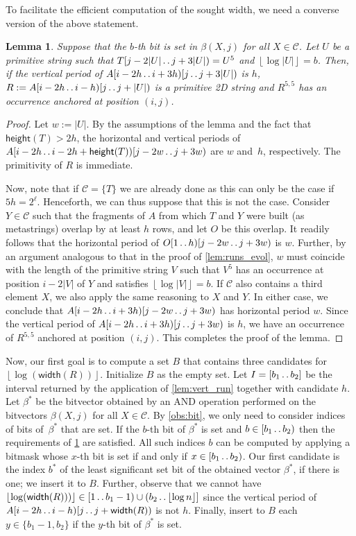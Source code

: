 \documentclass[11pt,letterpaper]{article}
\newcommand{\floor}[1]{\left\lfloor #1 \right\rfloor}
\newcommand{\width}{\textsf{width}}
\newcommand{\height}{\textsf{height}}
\def\dd{\mathinner{.\,.}}
\newcommand{\C}{\mathcal{C}}
\newtheorem{lemma}[theorem]{Lemma}
\begin{document}
To facilitate the efficient computation of the sought width, we need a converse version of the above statement.

\begin{lemma}\label{lem:bit}
Suppose that the $b$-th bit is set in $\beta(X,j)$ for all $X \in \C$.
Let $U$ be a primitive string such that $T[j-2|U| \dd j+3|U|)=U^5$ and $\floor{\log |U|}=b$.
Then, if the vertical period of $A[i-2h \dd i+3h)[j \dd j+3|U|)$ is $h$, $R:=A[i-2h \dd i-h)[j \dd j+|U|)$ is a primitive 2D string and $R^{5,5}$ has an occurrence anchored at position $(i,j)$.
\end{lemma}
\begin{proof}
Let $w:=|U|$.
By the assumptions of the lemma and the fact that $\height(T)> 2h$, the horizontal and vertical periods of $A[i-2h \dd i-2h+\height(T))[j-2w \dd j+3w)$ are $w$ and~$h$, respectively.
The primitivity of $R$ is immediate.

Now, note that if $\C=\{T\}$ we are already done as this can only be the case if $5h=2^\ell$. Henceforth, we can thus suppose that this is not the case.
Consider $Y\in\C$ such that the fragments of $A$ from which $T$ and $Y$ were built (as metastrings) overlap by at least $h$ rows, and let $O$ be this overlap.
It readily follows that the horizontal period of $O[1\dd h)[j-2w \dd j+3w)$ is $w$.
Further, by an argument analogous to that in the proof of \cref{lem:runs_evol}, $w$ must coincide with the length of the primitive string $V$ such that $V^5$ has an occurrence at position $i-2|V|$ of $Y$ and satisfies $\floor{\log |V|}=b$.
If $\C$ also contains a third element $X$, we also apply the same reasoning to $X$ and $Y$.
In either case, we conclude that $A[i-2h \dd i+3h)[j-2w \dd j+3w)$ has horizontal period $w$. Since the vertical period of $A[i-2h \dd i+3h)[j \dd j+3w)$ is $h$, we have an occurrence of $R^{5,5}$ anchored at position $(i,j)$. This completes the proof of the lemma.
\end{proof}

Now, our first goal is to compute a set $B$ that contains three candidates for $\floor{\log (\width(R))}$.
Initialize $B$ as the empty set.
Let $I=[b_1 \dd b_2]$ be the interval returned by the application of \cref{lem:vert_run} together with candidate $h$.
Let $\beta^*$ be the bitvector obtained by an AND operation performed on the bitvectors $\beta(X,j)$ for all $X \in \C$.
By \cref{obs:bit}, we only need to consider indices of bits of~$\beta^*$ that are set.
If the $b$-th bit of $\beta^*$ is set and $b \in [b_1 \dd b_2)$ then the requirements of \cref{lem:bit} are satisfied.
All such indices $b$ can be computed by applying a bitmask whose $x$-th bit is set if and only if $x \in [b_1 \dd b_2)$.
Our first candidate is the index $b^*$ of the least significant set bit of the obtained vector $\beta^*$, if there is one; we insert it to $B$.
Further, observe that we cannot have $\floor{\log (\width(R)))} \in [1 \dd b_1-1) \cup (b_2 \dd \floor{\log n}]$ since the vertical period of $A[i-2h \dd i-h)[j \dd j+\width(R))$ is not $h$.
Finally, insert to $B$ each $y\in \{b_1-1,b_2\}$ if the $y$-th bit of $\beta^*$ is set.
\end{document}
